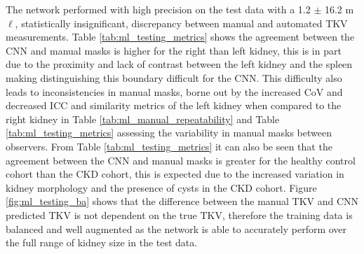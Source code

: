 The network performed with high precision on the test data with a 1.2 $\pm$ 16.2 m$\ell$, statistically insignificant, discrepancy between manual and automated \ac{TKV} measurements. Table \ref{tab:ml_testing_metrics} shows the agreement between the \ac{CNN} and manual masks is higher for the right than left kidney, this is in part due to the proximity and lack of contrast between the left kidney and the spleen making distinguishing this boundary difficult for the \ac{CNN}. This difficulty also leads to inconsistencies in manual masks, borne out by the increased \ac{CoV} and decreased \ac{ICC} and similarity metrics of the left kidney when compared to the right kidney in Table \ref{tab:ml_manual_repeatability} and Table \ref{tab:ml_testing_metrics} assessing the variability in manual masks between observers. From Table \ref{tab:ml_testing_metrics} it can also be seen that the agreement between the \ac{CNN} and manual masks is greater for the healthy control cohort than the \ac{CKD} cohort, this is expected due to the increased variation in kidney morphology and the presence of cysts in the \ac{CKD} cohort. Figure \ref{fig:ml_testing_ba} shows that the difference between the manual \ac{TKV} and \ac{CNN} predicted \ac{TKV} is not dependent on the true \ac{TKV}, therefore the training data is balanced and well augmented as the network is able to accurately perform over the full range of kidney size in the test data. 

